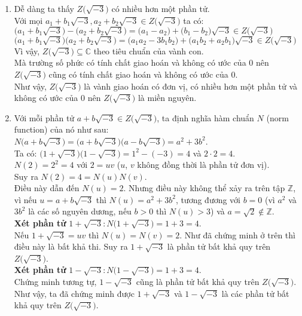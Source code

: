 \justifying
\begin{enumerate}[label=\alph*.]
    \item Dễ dàng ta thấy $Z \big( \sqrt{-3} \big)$ có nhiều hơn một phần tử.\\
    Với mọi $a_1 + b_1\sqrt{-3}, a_2 + b_2\sqrt{-3} \in Z \big( \sqrt{-3} \big)$ ta có:\\
    $\big( a_1 + b_1\sqrt{-3} \big) - \big( a_2 + b_2\sqrt{-3} \big) = \big( a_1 - a_2 \big) + \big( b_1 - b_2 \big)\sqrt{-3} \in Z \big( \sqrt{-3} \big)$\\
    $\big( a_1 + b_1\sqrt{-3} \big) \big( a_2 + b_2\sqrt{-3} \big) = \big( a_1 a_2 - 3 b_1 b_2 \big) + \big( a_1 b_2 + a_2 b_1 \big)\sqrt{-3} \in Z \big( \sqrt{-3} \big)$\\
    Vì vậy, $Z \big( \sqrt{-3} \big) \subseteq \mathbb{C}$ theo tiêu chuẩn của vành con.\\
    Mà trường số phức có tính chất giao hoán và không có ước của 0 nên $Z \big( \sqrt{-3} \big)$ cũng có tính chất giao hoán và không có ước của 0.\\
    Như vậy, $Z \big( \sqrt{-3} \big)$ là vành giao hoán có đơn vị, có nhiều hơn một phần tử và không có ước của 0 nên $Z \big( \sqrt{-3} \big)$ là miền nguyên.
    \item Với mỗi phần tử $a + b\sqrt{-3} \in Z \big( \sqrt{-3} \big)$, ta định nghĩa hàm chuẩn $N$ (norm function) của nó như sau: $N \big( a + b\sqrt{-3} \big) = \big( a + b\sqrt{-3} \big) \big( a - b\sqrt{-3} \big) = a^2 + 3b^2$.\\
    Ta có: $\big(1 + \sqrt{-3}\big)\big(1 - \sqrt{-3}\big) = 1^2 - (-3) = 4$ và $2 \cdot 2 = 4$.\\
    $N(2) = 2^2 = 4$ với $2 = uv$ ($u$, $v$ không đồng thời là phần tử đơn vị).\\
    Suy ra $N(2) = 4 = N(u)N(v)$.\\
    Điều này dẫn đến $N(u) = 2$. Nhưng điều này không thể xảy ra trên tập $\mathbb{Z}$, vì nếu $u = a + b\sqrt{-3}$ thì $N(u) = a^2 + 3b^2$, tương đương với $b = 0$ (vì $a^2$ và $3b^2$ là các số nguyên dương, nếu $b > 0$ thì $N(u) > 3$) và $a = \sqrt{2} \not \in \mathbb{Z}$.\\
    \textbf{Xét phần tử} $1 + \sqrt{-3}: N \big( 1 + \sqrt{-3} \big) = 1 + 3 = 4$.\\
    Nếu $1 + \sqrt{-3} = uv$ thì $N(u) = N(v) = 2$. Như đã chứng minh ở trên thì điều này là bất khả thi. Suy ra $1 + \sqrt{-3}$ là phần tử bất khả quy trên $Z \big( \sqrt{-3} \big)$.\\
    \textbf{Xét phần tử} $1 - \sqrt{-3}: N \big( 1 - \sqrt{-3} \big) = 1 + 3 = 4$.\\
    Chứng minh tương tự, $1 - \sqrt{-3}$ cũng là phần tử bất khả quy trên $Z \big( \sqrt{-3} \big)$.
    Như vậy, ta đã chứng minh được $1 + \sqrt{-3}$ và $1 - \sqrt{-3}$ là các phần tử bất khả quy trên $Z \big( \sqrt{-3} \big)$.
\end{enumerate}
\clearpage